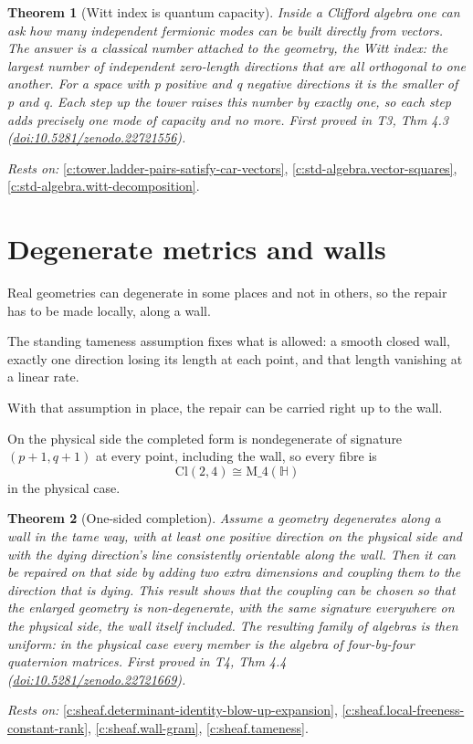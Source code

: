 \documentclass[11pt]{article}
\newtheorem{theorem}{Theorem}[section]
\theoremstyle{definition}
\theoremstyle{plain}
\providecommand{\Cl}{}\renewcommand{\Cl}{\mathrm{Cl}}
\providecommand{\HH}{}\renewcommand{\HH}{\mathbb{H}}
\providecommand{\Mat}{}\renewcommand{\Mat}{\mathrm{M}}
\begin{document}
\begin{theorem}[Witt index is quantum capacity]\label{c:tower.witt-index-quantum-capacity}
Inside a Clifford algebra one can ask how many independent fermionic modes can be built directly from vectors. The answer is a classical number attached to the geometry, the Witt index: the largest number of independent zero-length directions that are all orthogonal to one another. For a space with p positive and q negative directions it is the smaller of p and q. Each step up the tower raises this number by exactly one, so each step adds precisely one mode of capacity and no more.
\emph{First proved in} T3, Thm 4.3 (\href{https://doi.org/10.5281/zenodo.22721556}{doi:10.5281/zenodo.22721556}).
\end{theorem}
\noindent\emph{Rests on:} \ref{c:tower.ladder-pairs-satisfy-car-vectors}, \ref{c:std-algebra.vector-squares}, \ref{c:std-algebra.witt-decomposition}.

\section{Degenerate metrics and walls}

Real geometries can degenerate in some places and not in others, so the repair has to be made locally, along a wall.

The standing tameness assumption fixes what is allowed: a smooth closed wall, exactly one direction losing its length at each point, and that length vanishing at a linear rate.

With that assumption in place, the repair can be carried right up to the wall.

On the physical side the completed form is nondegenerate of signature $(p{+}1, q{+}1)$ at every point, including the wall, so every fibre is \[ \Cl(2,4) \cong \Mat\_4(\HH) \] in the physical case.

\begin{theorem}[One-sided completion]\label{c:sheaf.one-sided-completion}
Assume a geometry degenerates along a wall in the tame way, with at least one positive direction on the physical side and with the dying direction's line consistently orientable along the wall. Then it can be repaired on that side by adding two extra dimensions and coupling them to the direction that is dying. This result shows that the coupling can be chosen so that the enlarged geometry is non-degenerate, with the same signature everywhere on the physical side, the wall itself included. The resulting family of algebras is then uniform: in the physical case every member is the algebra of four-by-four quaternion matrices.
\emph{First proved in} T4, Thm 4.4 (\href{https://doi.org/10.5281/zenodo.22721669}{doi:10.5281/zenodo.22721669}).
\end{theorem}
\noindent\emph{Rests on:} \ref{c:sheaf.determinant-identity-blow-up-expansion}, \ref{c:sheaf.local-freeness-constant-rank}, \ref{c:sheaf.wall-gram}, \ref{c:sheaf.tameness}.
\end{document}

